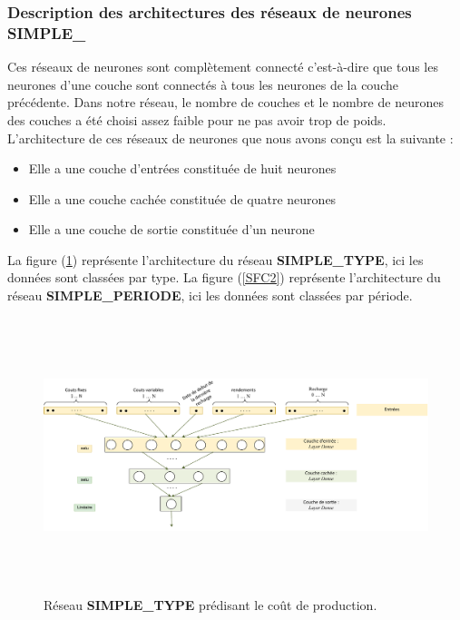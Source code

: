\subsubsection{Description des architectures des réseaux de neurones \textbf{SIMPLE\_}}

Ces réseaux de neurones sont complètement connecté c'est-à-dire que tous les neurones d'une couche sont connectés à tous les neurones de la couche précédente. Dans notre réseau, le nombre de couches et le nombre de neurones des couches a été choisi assez faible pour ne pas avoir trop de poids. %
L'architecture de ces réseaux de neurones que nous avons conçu est la suivante :

\begin{itemize}[label=$\square$]
	\item Elle a une couche d'entrées constituée de huit neurones
\item Elle a une couche cachée constituée de quatre neurones
\item Elle a une couche de sortie constituée d'un neurone
\end{itemize}   

La figure (\ref{SFC}) représente l'architecture du réseau \textbf{SIMPLE\_TYPE}, ici les données sont classées par type. La figure (\ref{SFC2}) représente l'architecture du réseau \textbf{SIMPLE\_PERIODE}, ici les données sont classées par période.
 
\begin{figure}[H]
	\centerline{
		\includegraphics[height=8cm]{images_these/SFC.pdf}}
	\caption[Réseau SIMPLE\_TYPE]{Réseau \textbf{SIMPLE\_TYPE} prédisant le coût de production.}
	\label{SFC}
\end{figure}


